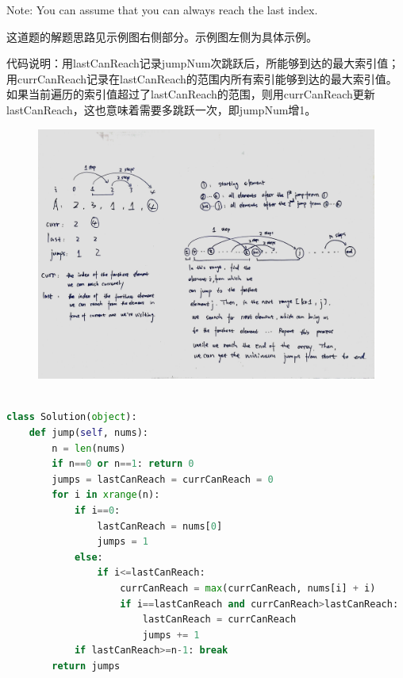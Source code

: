 \documentclass[a4paper,10pt]{article}
\begin{document}
\noindent Note: You can assume that you can always reach the last index.

\begin{CJK*}{UTF8}{gbsn}
\noindent 这道题的解题思路见示例图右侧部分。示例图左侧为具体示例。

\noindent 代码说明：用lastCanReach记录jumpNum次跳跃后，所能够到达的最大索引值；用currCanReach记录在lastCanReach的范围内所有索引能够到达的最大索引值。如果当前遍历的索引值超过了lastCanReach的范围，则用currCanReach更新lastCanReach，这也意味着需要多跳跃一次，即jumpNum增1。
\end{CJK*}

\begin{figure}[h]
    \includegraphics[width=\textwidth]{leetcode45.jpg}
    \centering \\
\end{figure}

\begin{lstlisting}[language=Python, caption=Problem45. Jump Game II]

class Solution(object):
    def jump(self, nums):
        n = len(nums)
        if n==0 or n==1: return 0
        jumps = lastCanReach = currCanReach = 0
        for i in xrange(n):
            if i==0:
                lastCanReach = nums[0]
                jumps = 1
            else:
                if i<=lastCanReach:
                    currCanReach = max(currCanReach, nums[i] + i)
                    if i==lastCanReach and currCanReach>lastCanReach:
                        lastCanReach = currCanReach
                        jumps += 1
            if lastCanReach>=n-1: break
        return jumps
\end{lstlisting}
\end{document}
